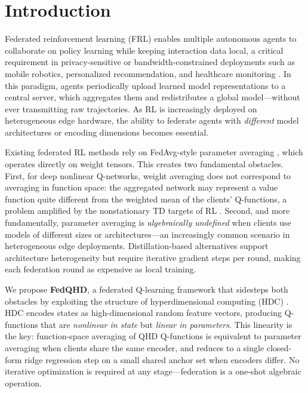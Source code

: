 \section{Introduction}
\label{sec:intro}

Federated reinforcement learning (FRL) enables multiple autonomous agents to collaborate on policy learning while keeping interaction data local, a critical requirement in privacy-sensitive or bandwidth-constrained deployments such as mobile robotics, personalized recommendation, and healthcare monitoring \citep{zhuo2019federated,khodadadian2022federated}. In this paradigm, agents periodically upload learned model representations to a central server, which aggregates them and redistributes a global model—without ever transmitting raw trajectories. As RL is increasingly deployed on heterogeneous edge hardware, the ability to federate agents with \emph{different} model architectures or encoding dimensions becomes essential.

Existing federated RL methods rely on FedAvg-style parameter averaging \citep{mcmahan2017communication,jin2022federated}, which operates directly on weight tensors. This creates two fundamental obstacles. First, for deep nonlinear Q-networks, weight averaging does not correspond to averaging in function space: the aggregated network may represent a value function quite different from the weighted mean of the clients' Q-functions, a problem amplified by the nonstationary TD targets of RL \citep{baird1995residual,van_hasselt2018deep}. Second, and more fundamentally, parameter averaging is \emph{algebraically undefined} when clients use models of different sizes or architectures—an increasingly common scenario in heterogeneous edge deployments. Distillation-based alternatives \citep{rusu2016policydistillation,shen2023fedhpd} support architecture heterogeneity but require iterative gradient steps per round, making each federation round as expensive as local training.

We propose \textbf{FedQHD}, a federated Q-learning framework that sidesteps both obstacles by exploiting the structure of hyperdimensional computing (HDC) \citep{kanerva2009hyperdimensional}. HDC encodes states as high-dimensional random feature vectors, producing Q-functions that are \emph{nonlinear in state} but \emph{linear in parameters}. This linearity is the key: function-space averaging of QHD Q-functions is equivalent to parameter averaging when clients share the same encoder, and reduces to a single closed-form ridge regression step on a small shared anchor set when encoders differ. No iterative optimization is required at any stage—federation is a one-shot algebraic operation.

